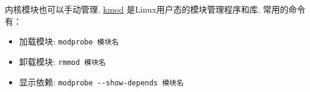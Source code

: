 \begin{notebox}
	内核模块也可以手动管理.
	\href{https://git.kernel.org/pub/scm/utils/kernel/kmod/kmod.git}{kmod}
	是Linux用户态的模块管理程序和库.
	常用的命令有：
	\begin{itemize}
		\item 加载模块: \lstinline{modprobe 模块名}
		\item 卸载模块: \lstinline{rmmod 模块名}
		\item 显示依赖: \lstinline{modprobe --show-depends 模块名}
	\end{itemize}
\end{notebox}

